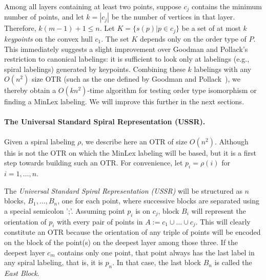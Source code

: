 \documentclass[leqno,12pt]{article}
\begin{document}
Among all layers containing at least two points, 
suppose $c_j$   contains the minimum number of points, and let $k = |c_j|$
 be the number of vertices in that layer.
 Therefore, $k(m{-}1)+1 \leq n$. 
Let $K = \{s(p)|p\in c_j\}$ be a set of at most $k$ \emph{keypoints} on the
convex hull $c_1$. 
The set $K$ depends only on the order
type of $P$. This immediately suggests a slight improvement over
Goodman and Pollack's restriction to canonical labelings: it is
sufficient to look only at labelings (e.g., spiral labelings)
generated by keypoints. 
Combining these $k$ labelings with any $O(n^2)$ size OTR (such as the
one defined by Goodman and Pollack~\cite{goodman_pollack_83_sorting}), 
we thereby obtain a 
$O(kn^2)$-time algorithm for testing order type isomorphism or finding a
MinLex labeling. We will improve this further in the next sections. \\

\paragraph{The Universal Standard Spiral Representation (USSR).}
Given a spiral labeling $\rho$, we describe here an OTR of size
$O(n^2)$. 
Although this is 
not the OTR on which the MinLex labeling
will be based,
but
 it is a first step towards building such an OTR.
For convenience, let $p_i = \rho(i)$ for $i = 1,\ldots,n$.

The \emph{Universal Standard Spiral Representation (USSR)} will be
structured as $n$ blocks, $B_1,\ldots,B_n$, one for each point, where 
successive blocks are separated using a special semicolon ';'. Assuming point $p_i$ is
on 
$c_j$,
block $B_i$ will represent the orientation of $p_i$ with
every pair of points 
in 
$A := c_1 \cup \ldots \cup c_j$. 
This will clearly
constitute an OTR 
because the orientation of any  triple
of points will be encoded on the block of the point(s) on the
deepest layer among those three. 
If the deepest layer $c_m$ contains only
one point, that point always has the last label in any spiral
labeling, that is, it is $p_n$. In that case, 
the last block 
$B_n$ is
called the \emph{East Block}.
\end{document}
